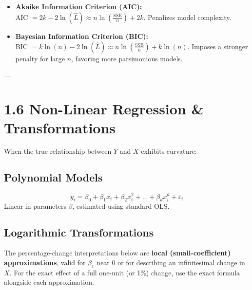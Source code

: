 \documentclass[
]{article}
\begin{document}
\begin{itemize}
\item
  \textbf{Akaike Information Criterion (AIC):}
  \(\text{AIC } = 2k - 2\ln(\hat{L}) \approx n\ln(\frac{\text{SSE}}{n}) + 2k\).
  Penalizes model complexity.
\item
  \textbf{Bayesian Information Criterion (BIC):}
  \(\text{BIC } = k\ln(n) - 2\ln(\hat{L}) \approx n\ln(\frac{\text{SSE}}{n}) + k\ln(n)\).
  Imposes a stronger penalty for large \(n\), favoring more parsimonious
  models.
\end{itemize}

---

\textbf{ }

\section{1.6 Non-Linear Regression \& Transformations}

When the true relationship between \(Y\) and \(X\) exhibits curvature:

\textbf{ }

\subsection{Polynomial Models}

\[y_{i} = \beta_{0} + \beta_{1}x_{i} + \beta_{2}x_{i}^{2} + \ldots + \beta_{d}x_{i}^{d} + \varepsilon_{i}\]
Linear in parameters \(\beta\), estimated using standard OLS.

\textbf{ }

\subsection{Logarithmic Transformations}

The percentage-change interpretations below are \textbf{local
(small-coefficient) approximations}, valid for \(\beta_{1}\) near 0 or
for describing an infinitesimal change in \(X\). For the exact effect of
a full one-unit (or 1\%) change, use the exact formula alongside each
approximation.
\end{document}
